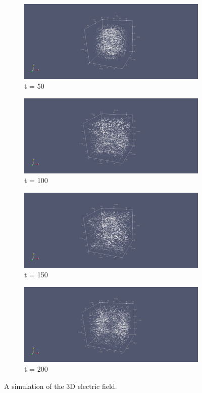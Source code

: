 \begin{figure}[h!]
	\centering
	\begin{subfigure}{.49\textwidth}
		\centering
		\includegraphics[width=.95\linewidth]{Figures/FDTD3DE1}
		\caption{t = 50}
	\end{subfigure}
	\begin{subfigure}{.49\textwidth}
		\centering
		\includegraphics[width=.95\linewidth]{Figures/FDTD3DE2}
		\caption{t = 100}
	\end{subfigure}
	\begin{subfigure}{.49\textwidth}
		\centering
		\includegraphics[width=.95\linewidth]{Figures/FDTD3DE3}
		\caption{t = 150}
	\end{subfigure}
	\begin{subfigure}{.49\textwidth}
		\centering
		\includegraphics[width=.95\linewidth]{Figures/FDTD3DE4}
		\caption{t = 200}
	\end{subfigure}
	\decoRule
	\caption[3D Electric Field Simulation]{A simulation of the 3D electric field.}
	\label{fig:FDTD3DE}
\end{figure}

